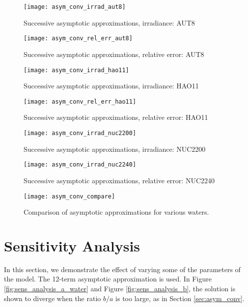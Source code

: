 \begin{figure}[H]
  \centering
  \texttt{[image: asym\_conv\_irrad\_aut8]}
  \caption{Successive asymptotic approximations, irradiance: AUT8}
\end{figure}

\begin{figure}[H]
  \centering
  \texttt{[image: asym\_conv\_rel\_err\_aut8]}
  \caption{Successive asymptotic approximations, relative error: AUT8}
\end{figure}


\begin{figure}[H]
  \centering
  \texttt{[image: asym\_conv\_irrad\_hao11]}
  \caption{Successive asymptotic approximations, irradiance: HAO11}
\end{figure}

\begin{figure}[H]
  \centering
  \texttt{[image: asym\_conv\_rel\_err\_hao11]}
  \caption{Successive asymptotic approximations, relative error: HAO11}
\end{figure}


\begin{figure}[H]
  \centering
  \texttt{[image: asym\_conv\_irrad\_nuc2200]}
  \caption{Successive asymptotic approximations, irradiance: NUC2200}
\end{figure}

\begin{figure}[H]
  \centering
  \texttt{[image: asym\_conv\_irrad\_nuc2240]}
  \caption{Successive asymptotic approximations, relative error: NUC2240}
\end{figure}


\begin{figure}[H]
  \centering
  \texttt{[image: asym\_conv\_compare]}
  \caption{Comparison of asymptotic approximations for various waters.}
  \label{fig:asym_conv_compare}
\end{figure}

\section{Sensitivity Analysis}
In this section, we demonstrate the effect of varying some of the parameters of the model.
The 12-term asymptotic approximation is used.
In Figure \ref{fig:sens_analysis_a_water} and Figure \ref{fig:sens_analysis_b}, the solution
is shown to diverge when the ratio $b/a$ is too large, as in Section \ref{sec:asym_conv}.

